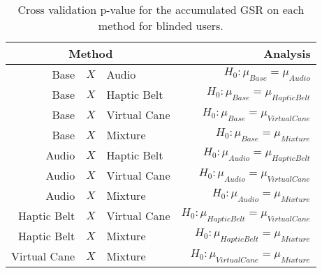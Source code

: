 
\begin{table}[!htb]
\centering
\caption{Cross validation p-value for the accumulated GSR on each method for blinded users.}
\label{tab:lsd_gsr_sum}
\begin{tabular}{rclr}
\toprule
      \multicolumn{3}{c}{Method} &                                       Analysis \\
\midrule
              Base & $X$ & Audio &               $H_0 : \mu_{Base} = \mu_{Audio}$ \\
        Base & $X$ & Haptic Belt &         $H_0 : \mu_{Base} = \mu_{Haptic Belt}$ \\
       Base & $X$ & Virtual Cane &        $H_0 : \mu_{Base} = \mu_{Virtual Cane}$ \\
            Base & $X$ & Mixture &             $H_0 : \mu_{Base} = \mu_{Mixture}$ \\
       Audio & $X$ & Haptic Belt &        $H_0 : \mu_{Audio} = \mu_{Haptic Belt}$ \\
      Audio & $X$ & Virtual Cane &       $H_0 : \mu_{Audio} = \mu_{Virtual Cane}$ \\
           Audio & $X$ & Mixture &            $H_0 : \mu_{Audio} = \mu_{Mixture}$ \\
Haptic Belt & $X$ & Virtual Cane & $H_0 : \mu_{Haptic Belt} = \mu_{Virtual Cane}$ \\
     Haptic Belt & $X$ & Mixture &      $H_0 : \mu_{Haptic Belt} = \mu_{Mixture}$ \\
    Virtual Cane & $X$ & Mixture &     $H_0 : \mu_{Virtual Cane} = \mu_{Mixture}$ \\
\bottomrule
\end{tabular}
\end{table}

